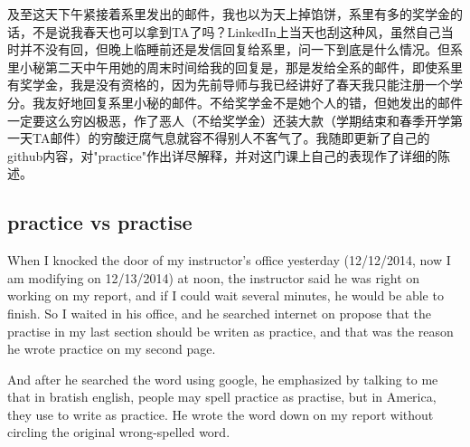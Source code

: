 \documentclass[12pt]{book}
\begin{document}
及至这天下午紧接着系里发出的邮件，我也以为天上掉馅饼，系里有多的奖学金的话，不是说我春天也可以拿到TA了吗？LinkedIn上当天也刮这种风，虽然自己当时并不没有回，但晚上临睡前还是发信回复给系里，问一下到底是什么情况。但系里小秘第二天中午用她的周末时间给我的回复是，那是发给全系的邮件，即使系里有奖学金，我是没有资格的，因为先前导师与我已经讲好了春天我只能注册一个学分。我友好地回复系里小秘的邮件。不给奖学金不是她个人的错，但她发出的邮件一定要这么穷凶极恶，作了恶人（不给奖学金）还装大款（学期结束和春季开学第一天TA邮件）的穷酸迂腐气息就容不得别人不客气了。我随即更新了自己的github内容，对"practice"作出详尽解释，并对这门课上自己的表现作了详细的陈述。
\subsection{practice vs practise}
\label{sec-36-2-1}
When I knocked the door of my instructor’s office yesterday (12/12/2014, now I am modifying on 12/13/2014) at noon, the instructor said he was right on working on my report, and if I could wait several minutes, he would be able to finish. So I waited in his office, and he searched internet on propose that the practise in my last section should be writen as practice, and that was the reason he wrote practice on my second page.

And after he searched the word using google, he emphasized by talking to me that in bratish english, people may spell practice as practise, but in America, they use to write as practice. He wrote the word down on my report without circling the original wrong-spelled word.
\end{document}

